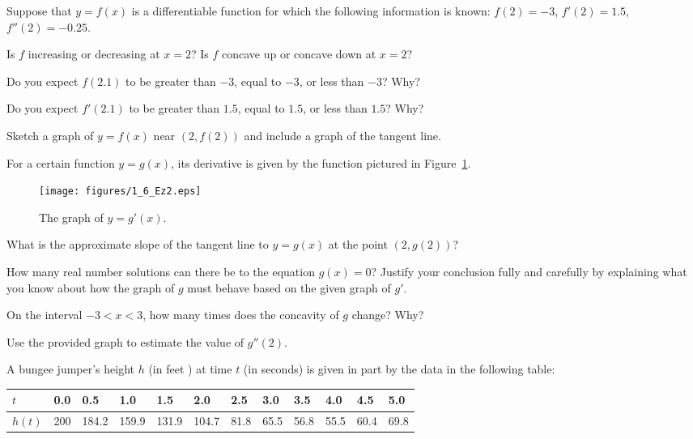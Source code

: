 \begin{exercises} 
\item Suppose that $y = f(x)$ is a differentiable function for which the following information is known:  $f(2) = -3$, $f'(2) = 1.5$, $f''(2) = -0.25$.
\ba
	\item Is $f$ increasing or decreasing at $x = 2$?  Is $f$ concave up or concave down at $x = 2$?
	\item Do you expect $f(2.1)$ to be greater than $-3$, equal to $-3$, or less than $-3$?  Why?
	\item Do you expect $f'(2.1)$ to be greater than $1.5$, equal to $1.5$, or less than $1.5$?  Why?
	\item Sketch a graph of $y = f(x)$ near $(2,f(2))$ and include a graph of the tangent line.  
\ea
\begin{exerciseSolution}
\end{exerciseSolution}
\item For a certain function $y = g(x)$, its derivative is given by the function pictured in Figure~\ref{F:1.6.Ez2}.
\begin{figure}[ht]
\begin{center}
\texttt{[image: figures/1\_6\_Ez2.eps]}
\caption{The graph of $y = g'(x)$.} \label{F:1.6.Ez2}
\end{center}
\end{figure}
\ba
	\item What is the approximate slope of the tangent line to $y = g(x)$ at the point $(2,g(2))$?
	\item How many real number solutions can there be to the equation $g(x) = 0$?  Justify your conclusion fully and carefully by explaining what you know about how the graph of $g$ must behave based on the given graph of $g'$.
	\item On the interval $-3 < x < 3$, how many times does the concavity of $g$ change?  Why?
	\item Use the provided graph to estimate the value of $g''(2)$.
\ea
\item A bungee jumper's height $h$ (in feet ) at time $t$ (in seconds) is given in part by the data in the following table:

\begin{tabular}{| l || l | l | l |  l | l | l | l | l | l | l | l |}
\hline
$t$ & 0.0 & 0.5 & 1.0 & 1.5 & 2.0 & 2.5 & 3.0 & 3.5 & 4.0 & 4.5 & 5.0    \\ \hline \hline
$h(t)$ & 200 & 184.2 &  159.9 &  131.9 &  104.7 & 81.8 &  65.5 &  56.8 &  55.5 & 60.4 & 69.8 
\\ \hline
\end{tabular}


\end{exercises}
